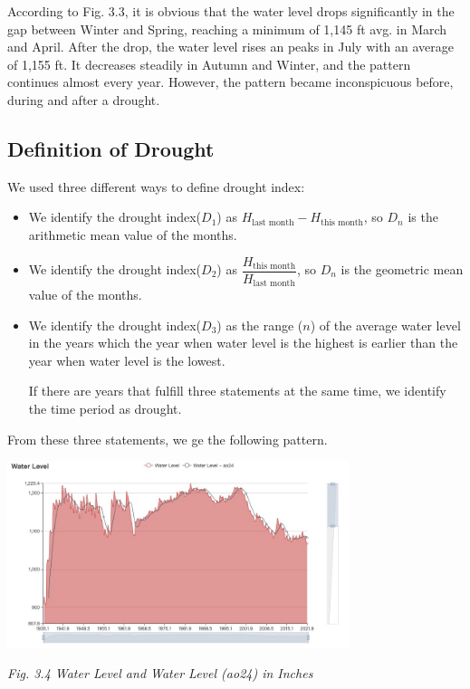 \documentclass[12pt]{article}
\theoremstyle{definition}
\theoremstyle{remark}
\numberwithin{equation}{section}
\begin{document}
		According to Fig. 3.3, it is obvious that the water level drops significantly in the gap between Winter and
		Spring, reaching a minimum of 1,145 ft avg. in March and April. After the drop, the water level rises an 
		peaks in July with an average of 1,155 ft. It decreases steadily in Autumn and Winter, and the pattern
		continues almost every year. However, the pattern became inconspicuous before, during and after a drought.
		
	\subsection{Definition of Drought}
		We used three different ways to define drought index:
		\begin{itemize}
			\item We identify the drought index($D_1$) as $H_\text{last month}-H_\text{this month}$, so $D_n$ is the arithmetic mean 
			value of the months.
			\item We identify the drought index($D_2$) as $\dfrac{H_\text{this month}}{H_\text{last month}}$, so $D_n$ is the  geometric
			mean value of the months.
			\item We identify the drought index($D_3$) as the range ($n$) of the average water level in the years which the year when water
			level is the highest is earlier than the year when water level is the lowest.
			
			If there are years that fulfill three statements at the same time, we identify the time period as drought.
		\end{itemize}

		From these three statements, we ge the following pattern.
		
		\begin{center}
		\includegraphics[width=10cm]{3.4 Water Level and Water Level (ao24) in Inches.jpg}

		\textit{Fig. 3.4 Water Level and Water Level (ao24) in Inches}
		\end{center}
		
\end{document}
